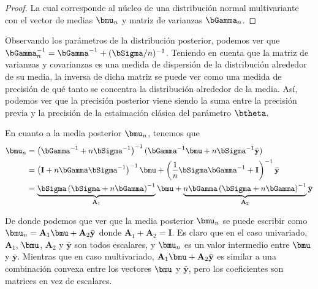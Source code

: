\documentclass[10pt,openright]{book}\usepackage[]{graphicx}\usepackage[]{color}
\begin{document}
\begin{proof}
La cual corresponde al n\'ucleo de una distribuci\'on normal multivariante con el vector de medias $\bmu_n$ y matriz de varianzas $\bGamma_n$.
\end{proof}

Observando los par\'ametros de la distribuci\'on posterior, podemos ver que $\bGamma_n^{-1} = \bGamma^{-1}+(\bSigma/n)^{-1}$. Teniendo en cuenta que la matriz de varianzas y covarianzas es una medida de dispersi\'on de la distribuci\'on alrededor de su media, la inversa de dicha matriz se puede ver como una medida de precisi\'on de qu\'e tanto se concentra la distribuci\'on alrededor de la media. As\'i, podemos ver que la precisi\'on posterior viene siendo la suma entre la precisi\'on previa y la precisi\'on de la estaimaci\'on cl\'asica del par\'ametro $\btheta$.

En cuanto a la media posterior $\bmu_n$, tenemos que
\begin{align*}
\bmu_n&=\left(\bGamma^{-1}+n\bSigma^{-1}\right)^{-1}
(\bGamma^{-1}\bmu+n \bSigma^{-1}\bar{\mathbf{y}})\\
&=\left(\mathbf{I}+n\bGamma\bSigma^{-1}\right)^{-1}\bmu+\left(\frac{1}{n}\bSigma\bGamma^{-1}+\mathbf{I}\right)^{-1}\bar{\mathbf{y}}\\
&=\underbrace{\bSigma\left(\bSigma+n\bGamma\right)^{-1}}_{\mathbf{A}_1}\bmu+\underbrace{n\bGamma\left(\bSigma+n\bGamma\right)^{-1}}_{\mathbf{A}_2}\bar{\mathbf{y}}
\end{align*}

De donde podemos que ver que la media posterior $\bmu_n$ se puede escribir como $\bmu_n=\mathbf{A}_1\bmu+\mathbf{A}_2\bar{\mathbf{y}}$ donde $\mathbf{A}_1+\mathbf{A}_2=\mathbf{I}$. Es claro que en el caso univariado, $\mathbf{A}_1$, $\bmu$, $\mathbf{A}_2$ y $\bar{\mathbf{y}}$ son todos escalares, y $\bmu_n$ es un valor intermedio entre $\bmu$ y $\bar{\mathbf{y}}$. Mientras que en caso multivariado, $\mathbf{A}_1\bmu+\mathbf{A}_2\bar{\mathbf{y}}$ es similar a una combinaci\'on convexa entre los vectores $\bmu$ y $\bar{\mathbf{y}}$, pero los coeficientes son matrices en vez de escalares. 
\end{document}
